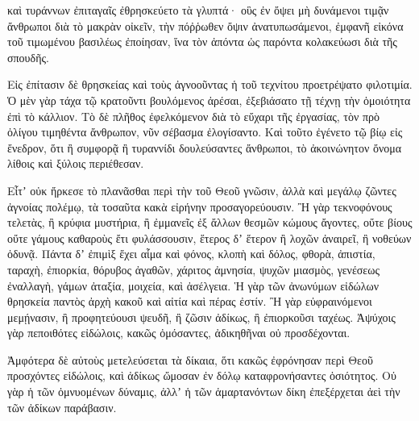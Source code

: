 {καὶ τυράννων ἐπιταγαῖς ἐθρησκεύετο τὰ γλυπτά· οὓς ἐν ὄψει μὴ δυνάμενοι τιμᾷν ἄνθρωποι διὰ τὸ μακρὰν οἰκεῖν, τὴν πόῤῥωθεν ὄψιν ἀνατυπωσάμενοι, ἐμφανῆ εἰκόνα τοῦ τιμωμένου βασιλέως ἐποίησαν, ἵνα τὸν ἀπόντα ὡς παρόντα κολακεύωσι διὰ τῆς σπουδῆς.
\par }{\PP {}Εἰς ἐπίτασιν δὲ θρησκείας καὶ τοὺς ἀγνοοῦντας ἡ τοῦ τεχνίτου προετρέψατο φιλοτιμία.
Ὁ μὲν γὰρ τάχα τῷ κρατοῦντι βουλόμενος ἀρέσαι, ἐξεβιάσατο τῇ τέχνῃ τὴν ὁμοιότητα ἐπὶ τὸ κάλλιον.
Τὸ δὲ πλῆθος ἐφελκόμενον διὰ τὸ εὔχαρι τῆς ἐργασίας, τὸν πρὸ ὀλίγου τιμηθέντα ἄνθρωπον, νῦν σέβασμα ἐλογίσαντο.
Καὶ τοῦτο ἐγένετο τῷ βίῳ εἰς ἔνεδρον, ὅτι ἢ συμφορᾷ ἢ τυραννίδι δουλεύσαντες ἄνθρωποι, τὸ ἀκοινώνητον ὄνομα λίθοις καὶ ξύλοις περιέθεσαν.
\par }{\PP {}Εἶτʼ οὐκ ἤρκεσε τὸ πλανᾶσθαι περὶ τὴν τοῦ Θεοῦ γνῶσιν, ἀλλὰ καὶ μεγάλῳ ζῶντες ἀγνοίας πολέμῳ, τὰ τοσαῦτα κακὰ εἰρήνην προσαγορεύουσιν.
Ἢ γὰρ τεκνοφόνους τελετὰς, ἢ κρύφια μυστήρια, ἢ ἐμμανεῖς ἐξ ἄλλων θεσμῶν κώμους ἄγοντες,
οὔτε βίους οὔτε γάμους καθαροὺς ἔτι φυλάσσουσιν, ἕτερος δʼ ἕτερον ἢ λοχῶν ἀναιρεῖ, ἢ νοθεύων ὀδυνᾷ.
Πάντα δʼ ἐπιμὶξ ἔχει αἷμα καὶ φόνος, κλοπὴ καὶ δόλος, φθορὰ, ἀπιστία, ταραχὴ, ἐπιορκία,
θόρυβος ἀγαθῶν, χάριτος ἀμνησία, ψυχῶν μιασμὸς, γενέσεως ἐναλλαγὴ, γάμων ἀταξία, μοιχεία, καὶ ἀσέλγεια.
Ἡ γὰρ τῶν ἀνωνύμων εἰδώλων θρησκεία παντὸς ἀρχὴ κακοῦ καὶ αἰτία καὶ πέρας ἐστίν.
Ἢ γὰρ εὐφραινόμενοι μεμῄνασιν, ἢ προφητεύουσι ψευδῆ, ἢ ζῶσιν ἀδίκως, ἢ ἐπιορκοῦσι ταχέως.
Ἀψύχοις γὰρ πεποιθότες εἰδώλοις, κακῶς ὀμόσαντες, ἀδικηθῆναι οὐ προσδέχονται.
\par }{\PP {}Ἀμφότερα δὲ αὐτοὺς μετελεύσεται τὰ δίκαια, ὅτι κακῶς ἐφρόνησαν περὶ Θεοῦ προσχόντες εἰδώλοις, καὶ ἀδίκως ὤμοσαν ἐν δόλῳ καταφρονήσαντες ὁσιότητος.
Οὐ γὰρ ἡ τῶν ὀμνυομένων δύναμις, ἀλλʼ ἡ τῶν ἁμαρτανόντων δίκη ἐπεξέρχεται ἀεὶ τὴν τῶν ἀδίκων παράβασιν.

}
